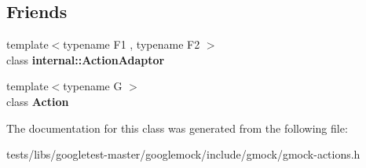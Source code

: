 \subsection*{Friends}
\begin{DoxyCompactItemize}
\item 
\mbox{\label{classtesting_1_1Action_a66fe4f9c9b9d020273151aa6054b491e}} 
{\footnotesize template$<$typename F1 , typename F2 $>$ }\\class {\bfseries internal\+::\+Action\+Adaptor}
\item 
\mbox{\label{classtesting_1_1Action_a62bc48ff11968b6e45d21c4b49f349fb}} 
{\footnotesize template$<$typename G $>$ }\\class {\bfseries Action}
\end{DoxyCompactItemize}


The documentation for this class was generated from the following file\+:\begin{DoxyCompactItemize}
\item 
tests/libs/googletest-\/master/googlemock/include/gmock/gmock-\/actions.\+h\end{DoxyCompactItemize}
